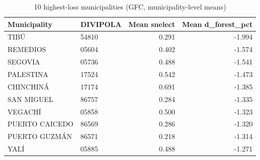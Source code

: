 \begin{table}

\caption{10 highest-loss municipalities (GFC, municipality-level means)}
\centering
\begin{tabular}[t]{llrr}
\toprule
Municipality & DIVIPOLA & Mean snelect & Mean d\_forest\_pct\\
\midrule
TIBÚ & 54810 & 0.291 & -1.994\\
REMEDIOS & 05604 & 0.402 & -1.574\\
SEGOVIA & 05736 & 0.488 & -1.541\\
PALESTINA & 17524 & 0.542 & -1.473\\
CHINCHINÁ & 17174 & 0.691 & -1.385\\
\addlinespace
SAN MIGUEL & 86757 & 0.284 & -1.335\\
VEGACHÍ & 05858 & 0.500 & -1.323\\
PUERTO CAICEDO & 86569 & 0.286 & -1.320\\
PUERTO GUZMÁN & 86571 & 0.218 & -1.314\\
YALÍ & 05885 & 0.488 & -1.271\\
\bottomrule
\end{tabular}
\end{table}
